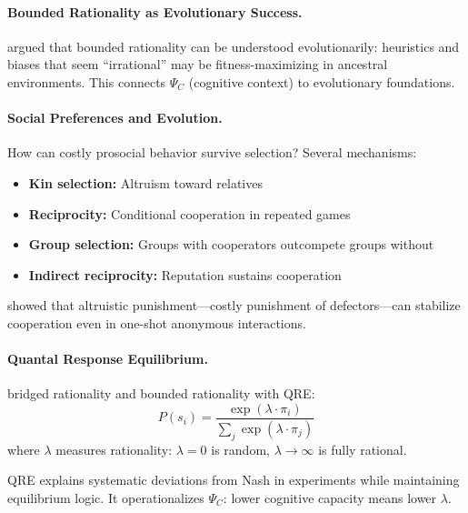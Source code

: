 \paragraph{Bounded Rationality as Evolutionary Success.}
\citet{gintis2009} argued that bounded rationality can be understood evolutionarily:
heuristics and biases that seem ``irrational'' may be fitness-maximizing in ancestral environments.
This connects $\Psi_C$ (cognitive context) to evolutionary foundations.

\paragraph{Social Preferences and Evolution.}
How can costly prosocial behavior survive selection? Several mechanisms:
\begin{itemize}
  \item \textbf{Kin selection:} Altruism toward relatives \citep{hamilton1964}
  \item \textbf{Reciprocity:} Conditional cooperation in repeated games \citep{axelrod1984evolution,nowak2006}
  \item \textbf{Group selection:} Groups with cooperators outcompete groups without \citep{boydricherson2005}
  \item \textbf{Indirect reciprocity:} Reputation sustains cooperation \citep{nowak1998}
\end{itemize}

\citet{fehr2004nature} showed that altruistic punishment---costly punishment of defectors---can
stabilize cooperation even in one-shot anonymous interactions.

\paragraph{Quantal Response Equilibrium.}
\citet{mckelvey1995} bridged rationality and bounded rationality with QRE:
\begin{equation}
  P(s_i) = \frac{\exp(\lambda \cdot \pi_i)}{\sum_j \exp(\lambda \cdot \pi_j)}
  \label{eq:qre}
\end{equation}
where $\lambda$ measures rationality: $\lambda = 0$ is random, $\lambda \to \infty$ is fully rational.

QRE explains systematic deviations from Nash in experiments while maintaining
equilibrium logic. It operationalizes $\Psi_C$: lower cognitive capacity means lower $\lambda$.

